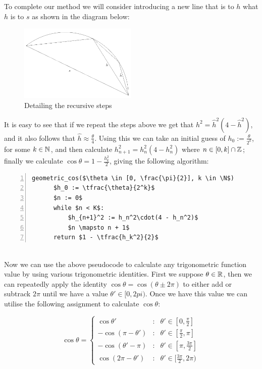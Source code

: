 To complete our method we will consider introducing a new line that is to \(h\) what \(h\) is to \(s\) as shown in the diagram below:

\begin{figure}[!ht]
	\label{FIG_"Geometric Trig 3"}
	\caption{Detailing the recursive steps}
	\centering
	\includegraphics[width=0.5\textwidth]{"./Diagrams/Geometric Trig Diagram 3"}
\end{figure}

It is easy to see that if we repeat the steps above we get that \(h^2 = \hat{h}^2(4 - \hat{h}^2)\), and it also follows that \(\hat{h} \approx \frac{\theta}{4}\). Using this we can take an initial guess of \(h_0 := \frac{\theta}{2^k}\), for some \(k \in \mathbb{N}\), and then calculate \(h_{n+1}^2 = h_n^2(4 - h_n^2)\) where \(n \in [0, k] \cap \mathbb{Z}\); finally we calculate \(\cos\theta = 1 - \frac{h_k^2}{2}\), giving the following algorithm:
  
\begin{lstlisting}[numbers=left,frame=single,mathescape,caption={Geometric calculation of \(\cos\)},label={PCD_"Geometric Cos"}]
  geometric_cos($\theta \in [0, \frac{\pi}{2}], k \in \N$)
      $h_0 := \tfrac{\theta}{2^k}$
      $n := 0$
      while $n < K$:
          $h_{n+1}^2 := h_n^2\cdot(4 - h_n^2)$
          $n \mapsto n + 1$
      return $1 - \tfrac{h_k^2}{2}$
\end{lstlisting}\\

Now we can use the above pseudocode to calculate any trigonometric function value by using various trigonometric identities. First we  suppose \(\theta \in \mathbb{R}\), then we can repeatedly apply the identity \(\cos\theta = \cos(\theta \pm 2\pi)\) to either add or subtrack \(2\pi\) until we have a value \(\theta' \in [0, 2pi)\). Once we have this value we can utilise the following assignment to calculate \(\cos\theta\):

\begin{displaymath}
	\cos\theta = \left\{ \begin{array}{lcl}
			\cos\theta' & : & \theta' \in [0, \frac{\pi}{2}]\\
			-\cos(\pi - \theta') & : & \theta' \in [\frac{\pi}{2}, \pi]\\
			-\cos(\theta' - \pi) & : & \theta' \in [\pi, \frac{3\pi}{2}]\\
			\cos(2\pi - \theta') & : & \theta' \in [\frac{3\pi}{2}, 2\pi)
		\end{array}\right.
\end{displaymath}

